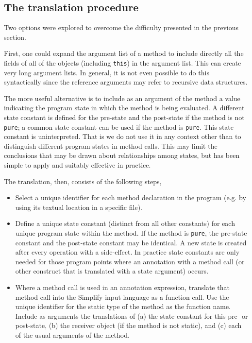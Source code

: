 \documentclass{sig-alternate}
\begin{document}
\subsection{The translation procedure}

Two options were explored to overcome the difficulty presented in the previous section.

First, one could expand the argument list of a method to include directly all the fields of all
of the objects (including \texttt{this}) in the argument list.  This can create very long
argument lists.  In general, it is not even possible to do this syntactically since the reference
arguments may refer to recursive data structures.

The more useful alternative is to include as an argument of the method a value indicating the
program state in which the method is being evaluated.  A different state constant is defined
for the pre-state and the post-state if the method is not \texttt{pure}; a common state
constant can be used if the method is \texttt{pure}.  This state constant is uninterpreted.
That is we do not use it in any context other than to distinguish different program states 
in method calls.
This may limit the conclusions that may be drawn about relationships among states, but has
been simple to apply and suitably effective in practice.

The translation, then, consists of the following steps,
\begin{itemize}
\item Select a unique identifier for each method declaration in the program (e.g. by using its
textual location in a specific file).
\item Define a unique state constant (distinct from all other constants) for each unique program
state within the method.  If the method is \texttt{pure}, the pre-state constant and the post-state
constant may be identical.  A new state is created after every operation with a side-effect.  In
practice state constants are only needed for those program points where an annotation with
a method call (or other construct that is translated with a state argument) occurs.
\item Where a method call is used in an annotation expression, translate that method call
into the Simplify input language as a function call.  Use the unique identifier for the static
type of the method as the function name.  Include as arguments the translations of (a) the
state constant for this pre- or post-state, (b) the receiver object (if the method is not static),
and (c) each of the usual arguments of the method.
\end{itemize}
\end{document}
